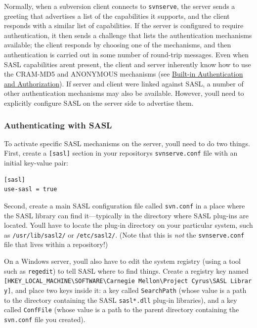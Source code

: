 Normally, when a subversion client connects to \texttt{svnserve}, the
server sends a greeting that advertises a list of the capabilities it
supports, and the client responds with a similar list of capabilities.
If the server is configured to require authentication, it then sends a
challenge that lists the authentication mechanisms available; the client
responds by choosing one of the mechanisms, and then authentication is
carried out in some number of round-trip messages. Even when SASL
capabilities aren\textquotesingle t present, the client and server
inherently know how to use the CRAM-MD5 and ANONYMOUS mechanisms (see
\hyperref[svn.serverconfig.svnserve.auth]{Built-in Authentication and
Authorization}). If server and client were linked against SASL, a number
of other authentication mechanisms may also be available. However,
you\textquotesingle ll need to explicitly configure SASL on the server
side to advertise them.

\subsubsection{Authenticating with
SASL}\label{svn.serverconfig.svnserve.sasl.authn}

To activate specific SASL mechanisms on the server,
you\textquotesingle ll need to do two things. First, create a
\texttt{{[}sasl{]}} section in your repository\textquotesingle s
\texttt{svnserve.conf} file with an initial key-value pair:

\begin{verbatim}
[sasl]
use-sasl = true
\end{verbatim}

Second, create a main SASL configuration file called \texttt{svn.conf}
in a place where the SASL library can find it---typically in the
directory where SASL plug-ins are located. You\textquotesingle ll have
to locate the plug-in directory on your particular system, such as
\texttt{/usr/lib/sasl2/} or \texttt{/etc/sasl2/}. (Note that this is
\emph{not} the \texttt{svnserve.conf} file that lives within a
repository!)

On a Windows server, you\textquotesingle ll also have to edit the system
registry (using a tool such as \texttt{regedit}) to tell SASL where to
find things. Create a registry key named
\texttt{{[}HKEY\_LOCAL\_MACHINE\textbackslash{}SOFTWARE\textbackslash{}Carnegie\ Mellon\textbackslash{}Project\ Cyrus\textbackslash{}SASL\ Library{]}},
and place two keys inside it: a key called \texttt{SearchPath} (whose
value is a path to the directory containing the SASL \texttt{sasl*.dll}
plug-in libraries), and a key called \texttt{ConfFile} (whose value is a
path to the parent directory containing the \texttt{svn.conf} file you
created).

